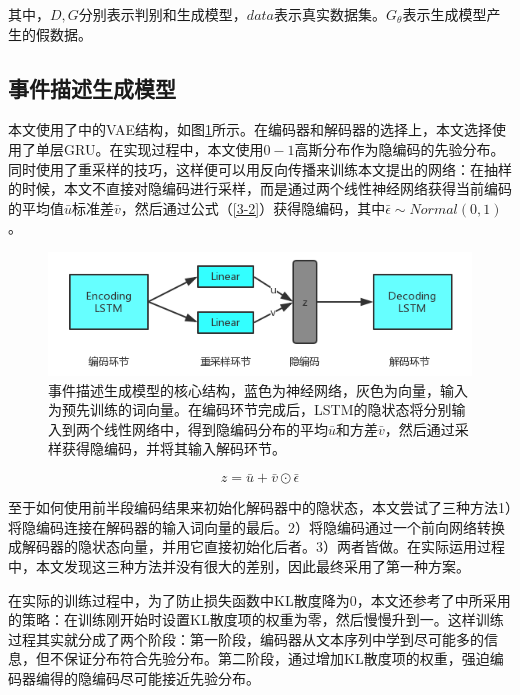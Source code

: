 其中，$D,G$分别表示判别和生成模型，$data$表示真实数据集。$G_\theta$表示生成模型产生的假数据。

\subsection{事件描述生成模型}
本文使用了\cite{bowman_generating_2015}中的VAE结构，如图\ref{f3-2}所示。在编码器和解码器的选择上，本文选择使用了单层GRU。在实现过程中，本文使用$0-1$高斯分布作为隐编码的先验分布。同时使用了重采样\cite{kingma_auto-encoding_2013}的技巧，这样便可以用反向传播来训练本文提出的网络：在抽样的时候，本文不直接对隐编码进行采样，而是通过两个线性神经网络获得当前编码的平均值$\bar{u}$标准差$\bar{v}$，然后通过公式（\ref{3-2}）获得隐编码，其中$\bar\epsilon \sim Normal(0,1)$。
\begin{figure}[htb]\label{f3-2}
    \centering
    \includegraphics[width=11.3cm]{vae.png}
    \caption{事件描述生成模型的核心结构，蓝色为神经网络，灰色为向量，输入为预先训练的词向量。在编码环节完成后，LSTM的隐状态将分别输入到两个线性网络中，得到隐编码分布的平均$\bar{u}$和方差$\bar{v}$，然后通过采样获得隐编码，并将其输入解码环节。}
\end{figure}
\begin{equation}\label{3-2}
    z=\bar{u}+\bar{v}\odot \bar\epsilon
\end{equation}

至于如何使用前半段编码结果来初始化解码器中的隐状态，本文尝试了三种方法1）将隐编码连接在解码器的输入词向量的最后。2）将隐编码通过一个前向网络转换成解码器的隐状态向量，并用它直接初始化后者。3）两者皆做。在实际运用过程中，本文发现这三种方法并没有很大的差别，因此最终采用了第一种方案。

在实际的训练过程中，为了防止损失函数中KL散度降为0，本文还参考了\cite{bowman_generating_2015}中所采用的策略：在训练刚开始时设置KL散度项的权重为零，然后慢慢升到一。这样训练过程其实就分成了两个阶段：第一阶段，编码器从文本序列中学到尽可能多的信息，但不保证分布符合先验分布。第二阶段，通过增加KL散度项的权重，强迫编码器编得的隐编码尽可能接近先验分布。

